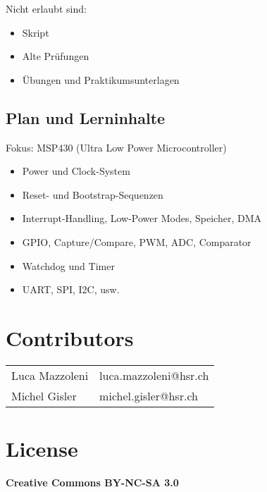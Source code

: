 {Nicht erlaubt sind:
\begin{itemize}
	\item Skript
	\item Alte Prüfungen
	\item Übungen und Praktikumsunterlagen
\end{itemize}

\subsection*{Plan und Lerninhalte}
Fokus: MSP430 (Ultra Low Power Microcontroller) 
 
    \begin{itemize}
    	\item Power und Clock-System
    	\item Reset- und Bootstrap-Sequenzen  
    	\item Interrupt-Handling, Low-Power Modes, Speicher, DMA
    	\item GPIO, Capture/Compare, PWM, ADC, Comparator  
    	\item Watchdog und Timer
    	\item UART, SPI, I2C, usw.
    \end{itemize}

\vfill
\section*{Contributors}
\begin{tabular}{ll}
    Luca Mazzoleni& luca.mazzoleni@hsr.ch \\ 
    Michel Gisler & michel.gisler@hsr.ch \\ 
\end{tabular} 

    \section*{License}
    \textbf{Creative Commons BY-NC-SA 3.0}
    
}
